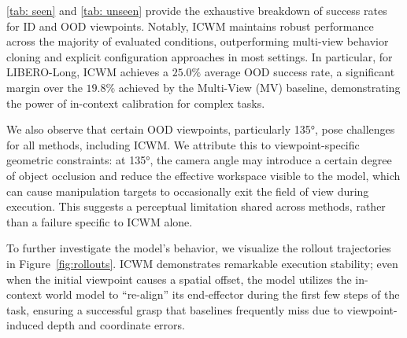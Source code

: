 \autoref{tab: seen} and \autoref{tab: unseen} provide the exhaustive breakdown of success rates for ID and OOD viewpoints. 
Notably, ICWM maintains robust performance across the majority of evaluated conditions, outperforming multi-view behavior cloning and explicit configuration approaches in most settings.
In particular, for LIBERO-Long, ICWM achieves a $25.0\%$ average OOD success rate, a significant margin over the $19.8\%$ achieved by the Multi-View (MV) baseline, demonstrating the power of in-context calibration for complex tasks. 

We also observe that certain OOD viewpoints, particularly 135°, pose challenges for all methods, including ICWM. We attribute this to viewpoint-specific geometric constraints: at 135°, the camera angle may introduce a certain degree of object occlusion and reduce the effective workspace visible to the model, which can cause manipulation targets to occasionally exit the field of view during execution. This suggests a perceptual limitation shared across methods, rather than a failure specific to ICWM alone.

To further investigate the model's behavior, we visualize the rollout trajectories in Figure~\ref{fig:rollouts}. ICWM demonstrates remarkable execution stability; even when the initial viewpoint causes a spatial offset, the model utilizes the in-context world model to ``re-align'' its end-effector during the first few steps of the task, ensuring a successful grasp that baselines frequently miss due to viewpoint-induced depth and coordinate errors.






